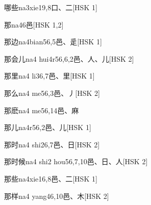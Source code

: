 \begin{entry}{哪些}{na3xie1}{9,8}{⼝、⼆}[HSK 1]
\end{entry}

\begin{entry}{那}{na4}{6}{⾢}[HSK 1,2]
\end{entry}

\begin{entry}{那边}{na4bian5}{6,5}{⾢、⾡}[HSK 1]
\end{entry}

\begin{entry}{那会儿}{na4 hui4r5}{6,6,2}{⾢、⼈、⼉}[HSK 2]
\end{entry}

\begin{entry}{那里}{na4 li3}{6,7}{⾢、⾥}[HSK 1]
\end{entry}

\begin{entry}{那么}{na4 me5}{6,3}{⾢、⼃}[HSK 2]
\end{entry}

\begin{entry}{那麽}{na4 me5}{6,14}{⾢、⿇}
\end{entry}

\begin{entry}{那儿}{na4r5}{6,2}{⾢、⼉}[HSK 1]
\end{entry}

\begin{entry}{那时}{na4 shi2}{6,7}{⾢、⽇}[HSK 2]
\end{entry}

\begin{entry}{那时候}{na4 shi2 hou5}{6,7,10}{⾢、⽇、⼈}[HSK 2]
\end{entry}

\begin{entry}{那些}{na4xie1}{6,8}{⾢、⼆}[HSK 1]
\end{entry}

\begin{entry}{那样}{na4 yang4}{6,10}{⾢、⽊}[HSK 2]
\end{entry}

